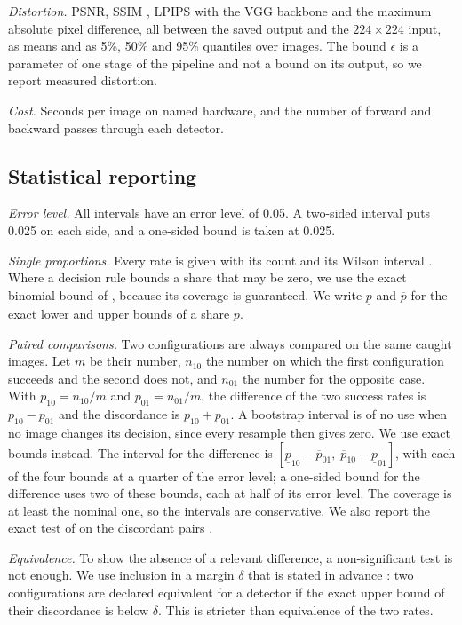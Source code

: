 \emph{Distortion.} PSNR, SSIM , LPIPS with the VGG backbone
 and the maximum absolute pixel difference, all between the saved output and
the $224\times224$ input, as means and as 5\%, 50\% and 95\% quantiles over images. The bound
$\epsilon$ is a parameter of one stage of the pipeline and not a bound on its output, so we report
measured distortion.

\emph{Cost.} Seconds per image on named hardware, and the number of forward and backward passes
through each detector.

\subsection{Statistical reporting}
\label{sec:statistics}

\emph{Error level.} All intervals have an error level of 0.05. A two-sided interval puts 0.025 on
each side, and a one-sided bound is taken at 0.025.

\emph{Single proportions.} Every rate is given with its count and its Wilson interval
. Where a decision rule bounds a share that may be
zero, we use the exact binomial bound of , because its
coverage is guaranteed. We write $\underline{p}$ and $\overline{p}$ for the exact lower and upper
bounds of a share $p$.

\emph{Paired comparisons.} Two configurations are always compared on the same caught images. Let
$m$ be their number, $n_{10}$ the number on which the first configuration succeeds and the second
does not, and $n_{01}$ the number for the opposite case. With $p_{10}=n_{10}/m$ and
$p_{01}=n_{01}/m$, the difference of the two success rates is $p_{10}-p_{01}$ and the discordance
is $p_{10}+p_{01}$. A bootstrap interval is of no use when no image changes its decision, since
every resample then gives zero. We use exact bounds instead. The interval for the difference is
$[\underline{p}_{10}-\overline{p}_{01},\;\overline{p}_{10}-\underline{p}_{01}]$, with each of the
four bounds at a quarter of the error level; a one-sided bound for the difference uses two of
these bounds, each at half of its error level. The coverage is at least the nominal one, so the intervals are
conservative. We also report the exact test of  on the discordant
pairs .

\emph{Equivalence.} To show the absence of a relevant difference, a non-significant test is not
enough. We use inclusion in a margin $\delta$ that is stated in advance
: two configurations are declared equivalent
for a detector if the exact upper bound of their discordance is below $\delta$. This is stricter
than equivalence of the two rates.

